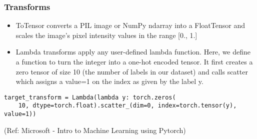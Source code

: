 \begin{frame}[fragile] \frametitle{Transforms}

\begin{itemize}
\item ToTensor converts a PIL image or NumPy ndarray into a FloatTensor and scales the image's pixel intensity values in the range [0., 1.]
\item Lambda transforms apply any user-defined lambda function. Here, we define a function to turn the integer into a one-hot encoded tensor. It first creates a zero tensor of size 10 (the number of labels in our dataset) and calls scatter which assigns a value=1 on the index as given by the label y.
\end{itemize}

\begin{lstlisting}
target_transform = Lambda(lambda y: torch.zeros(
    10, dtype=torch.float).scatter_(dim=0, index=torch.tensor(y), value=1))
\end{lstlisting}

\tiny{(Ref: Microsoft - Intro to Machine Learning using Pytorch)}
\end{frame}









